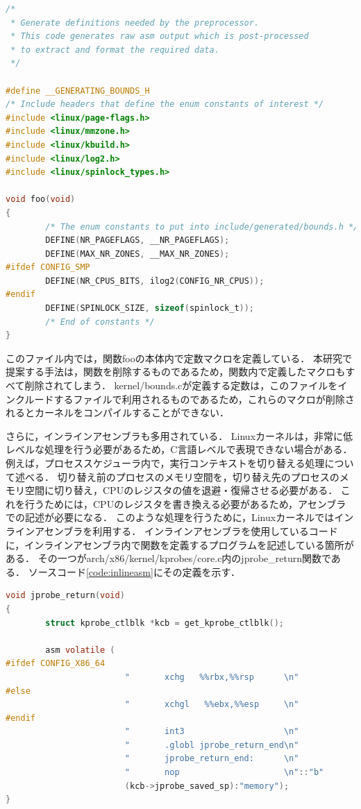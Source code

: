 \documentclass[graduation-thesis]{mlarticle}
\begin{document}
\begin{lstlisting}[language=C, caption=kernel/bounds.c, label=code:bounds]
/*
 * Generate definitions needed by the preprocessor.
 * This code generates raw asm output which is post-processed
 * to extract and format the required data.
 */

#define __GENERATING_BOUNDS_H
/* Include headers that define the enum constants of interest */
#include <linux/page-flags.h>
#include <linux/mmzone.h>
#include <linux/kbuild.h>
#include <linux/log2.h>
#include <linux/spinlock_types.h>

void foo(void)
{
        /* The enum constants to put into include/generated/bounds.h */
        DEFINE(NR_PAGEFLAGS, __NR_PAGEFLAGS);
        DEFINE(MAX_NR_ZONES, __MAX_NR_ZONES);
#ifdef CONFIG_SMP
        DEFINE(NR_CPUS_BITS, ilog2(CONFIG_NR_CPUS));
#endif
        DEFINE(SPINLOCK_SIZE, sizeof(spinlock_t));
        /* End of constants */
}
\end{lstlisting}

このファイル内では，関数fooの本体内で定数マクロを定義している．
本研究で提案する手法は，関数を削除するものであるため，関数内で定義したマクロもすべて削除されてしまう．
kernel/bounds.cが定義する定数は，このファイルをインクルードするファイルで利用されるものであるため，これらのマクロが削除されるとカーネルをコンパイルすることができない．

さらに，インラインアセンブラも多用されている．
Linuxカーネルは，非常に低レベルな処理を行う必要があるため，C言語レベルで表現できない場合がある．
例えば，プロセススケジューラ内で，実行コンテキストを切り替える処理について述べる．
切り替え前のプロセスのメモリ空間を，切り替え先のプロセスのメモリ空間に切り替え，CPUのレジスタの値を退避・復帰させる必要がある．
これを行うためには，CPUのレジスタを書き換える必要があるため，アセンブラでの記述が必要になる．
このような処理を行うために，Linuxカーネルではインラインアセンブラを利用する．
インラインアセンブラを使用しているコードに，インラインアセンブラ内で関数を定義するプログラムを記述している箇所がある．
その一つがarch/x86/kernel/kprobes/core.c内のjprobe\_return関数である．
ソースコード\ref{code:inlineasm}にその定義を示す．

\begin{lstlisting}[language=C, caption=jprobe\_return関数, label=code:inlineasm]
void jprobe_return(void)
{
        struct kprobe_ctlblk *kcb = get_kprobe_ctlblk();

        asm volatile (
#ifdef CONFIG_X86_64
                        "       xchg   %%rbx,%%rsp      \n"
#else
                        "       xchgl   %%ebx,%%esp     \n"
#endif
                        "       int3                    \n"
                        "       .globl jprobe_return_end\n"
                        "       jprobe_return_end:      \n"
                        "       nop                     \n"::"b"
                        (kcb->jprobe_saved_sp):"memory");
}
\end{lstlisting}
\end{document}
